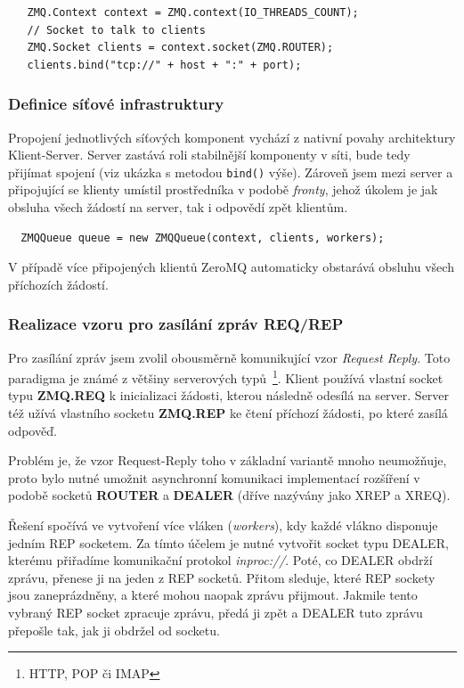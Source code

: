 \documentclass[thesis=M,czech]{FITthesis}[2014/05/07]
\begin{document}
\begin{verbatim}
   ZMQ.Context context = ZMQ.context(IO_THREADS_COUNT);
   // Socket to talk to clients
   ZMQ.Socket clients = context.socket(ZMQ.ROUTER);
   clients.bind("tcp://" + host + ":" + port);
\end{verbatim}

\subsubsection{Definice síťové infrastruktury}
\label{subsub:queue}
Propojení jednotlivých síťových komponent vychází z nativní povahy architektury Klient-Server. Server zastává roli stabilnější komponenty v síti, bude tedy přijímat spojení (viz ukázka s metodou \texttt{bind()} výše). Zároveň jsem mezi server a připojující se klienty umístil prostředníka v podobě \emph{fronty}, jehož úkolem je jak obsluha všech žádostí na server, tak i odpovědí zpět klientům.

\begin{verbatim}
  ZMQQueue queue = new ZMQQueue(context, clients, workers);
\end{verbatim}

V případě více připojených klientů ZeroMQ automaticky obstarává obsluhu všech příchozích žádostí. 

\subsubsection{Realizace vzoru pro zasílání zpráv REQ/REP}
Pro zasílání zpráv jsem zvolil obousměrně komunikující vzor \emph{Request Reply}. Toto paradigma je známé z většiny serverových typů~\footnote{HTTP, POP či IMAP}. Klient používá vlastní socket typu \textbf{ZMQ.REQ} k inicializaci žádosti, kterou následně odesílá na server. Server též užívá vlastního socketu \textbf{ZMQ.REP} ke čtení příchozí žádosti, po které zasílá odpověď. 

Problém je, že vzor Request-Reply toho v základní variantě mnoho neumožňuje, proto bylo nutné umožnit asynchronní komunikaci implementací rozšíření v podobě socketů \textbf{ROUTER} a \textbf{DEALER} (dříve nazývány jako XREP a XREQ). 

Řešení spočívá ve vytvoření více vláken (\emph{workers}), kdy každé vlákno disponuje jedním REP socketem. Za tímto účelem je nutné vytvořit socket typu DEALER, kterému přiřadíme komunikační protokol \emph{inproc://}. Poté, co DEALER obdrží zprávu, přenese ji na jeden z REP socketů. Přitom sleduje, které REP sockety jsou zaneprázdněny, a které mohou naopak zprávu přijmout. Jakmile tento vybraný REP socket zpracuje zprávu, předá ji zpět a DEALER tuto zprávu přepošle tak, jak ji obdržel od socketu.
\end{document}
